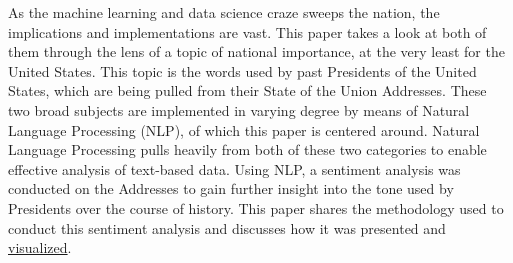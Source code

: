 As the machine learning and data science craze sweeps the nation, the implications and implementations are vast.
This paper takes a look at both of them through the lens of a topic of national importance, at the very least for the United States.
This topic is the words used by past Presidents of the United States, which are being pulled from their State of the Union Addresses.
These two broad subjects are implemented in varying degree by means of Natural Language Processing (NLP), of which this paper is centered around.
Natural Language Processing pulls heavily from both of these two categories to enable effective analysis of text-based data.
Using NLP, a sentiment analysis was conducted on the Addresses to gain further insight into the tone used by Presidents over the course of history.
This paper shares the methodology used to conduct this sentiment analysis and discusses how it was presented and \href{https://turing.cs.olemiss.edu/~dcrydeen/thesis/index.html}{visualized}.